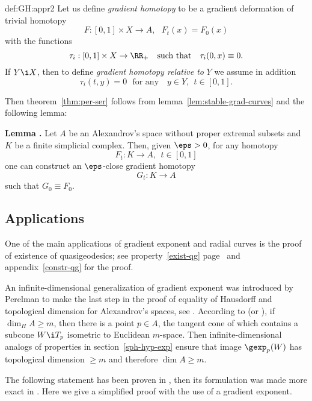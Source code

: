 {\begin{subthm}{def:GH:appr2}
Let us define {\it gradient homotopy} to be a gradient deformation of trivial homotopy 
$$F:[0,1]\times X\to A,\ \ \ F_t(x)=F_0(x)$$
with the functions 
$$\tau_i:[0,1]\times X\to\RR_+\ \ \ \text{such that}\ \ \ \tau_i(0,x)\equiv 0.$$
If $Y\i X$, then to define \emph{gradient homotopy relative to} $Y$ we assume in addition $$\tau_i(t,y)= 0 \ \ \ \text{for any }\ \ \ y\in Y,\ \ t\in[0,1].$$

Then theorem~\ref{thm:per-ser} follows from lemma~\ref{lem:stable-grad-curves} and the following lemma:

\begin{thm}{\bf Lemma \cite{petrunin:grad-hom}.}\label{lem:hom-approx} Let $A$ be an Alexandrov's space without proper extremal subsets and $K$ be a finite simplicial complex. 
Then, given $\eps>0$, for any  homotopy 
$$F_t:K\to A,\ \ t\in [0,1]$$ one can construct an $\eps$-close gradient homotopy 
$$G_t:K\to A$$ such that $G_0\equiv F_0$.
\end{thm}















\subsection{Applications}

One of the main applications of gradient exponent and radial curves is the proof
of existence of quasigeodesics; 
see property~\ref{exist-qg} page~\pageref{exist-qg} and appendix~\ref{constr-qg} for the proof.

An infinite-dimensional generalization of gradient exponent was introduced by Perelman to make the last step in the proof of equality of Hausdorff and topological dimension for Alexandrov's spaces, see \cite[A.4]{perelman-petrunin:qg}.
According to \cite{plaut:dimension} (or
\cite[151]{plaut:survey}), if $\dim_H A\ge m$, then there is a point $p\in A$, the tangent cone of which contains a subcone $W\i T_p$ isometric to Euclidean $m$-space.
Then infinite-dimensional analogs of properties  in section~\ref{sph-hyp-exp} ensure that image $\gexp_p (W)$ has topological dimension $\ge m$ and therefore $\dim A\ge m$.

The following statement has been proven in \cite{perelman:spaces2}, then its
formulation was made more exact in \cite{alexander-bishop:fk}. 
Here we give a simplified proof with the use of a gradient exponent.


\end{subthm}}
